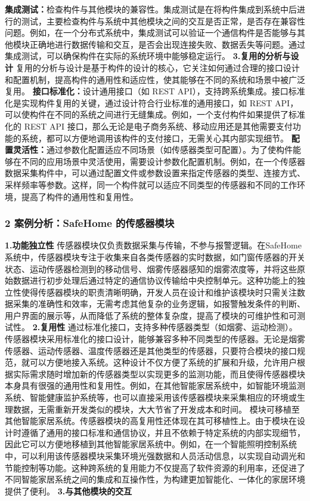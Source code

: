 \textbf{集成测试：}检查构件与其他模块的兼容性。集成测试是在将构件集成到系统中后进行的测试，主要检查构件与系统中其他模块之间的交互是否正常，是否存在兼容性问题。例如，在一个分布式系统中，集成测试可以验证一个通信构件是否能够与其他模块正确地进行数据传输和交互，是否会出现连接失败、数据丢失等问题。通过集成测试，可以确保构件在实际的系统环境中能够稳定运行。 \textbf{3.复用的分析与设计} 复用的分析与设计是基于构件的设计的核心，它关注如何通过合理的接口设计和配置机制，提高构件的通用性和适应性，使其能够在不同的系统和场景中被广泛复用。 \textbf{接口标准化：}设计通用接口（如 REST API），支持跨系统集成。接口标准化是实现构件复用的关键，通过设计符合行业标准的通用接口，如 REST API，可以使构件在不同的系统之间进行无缝集成。例如，一个支付构件如果提供了标准化的 REST API 接口，那么无论是电子商务系统、移动应用还是其他需要支付功能的系统，都可以方便地调用该构件的支付接口，无需关心其内部实现细节。 \textbf{配置灵活性：}通过参数化配置适应不同场景（如传感器类型可配置）。为了使构件能够在不同的应用场景中灵活使用，需要设计参数化配置机制。例如，在一个传感器数据采集构件中，可以通过配置文件或参数设置来指定传感器的类型、连接方式、采样频率等参数。这样，同一个构件就可以适应不同类型的传感器和不同的工作环境，提高了构件的通用性和复用性。 \subsubsection{2 案例分析：SafeHome 的传感器模块}\label{ux6848ux4f8bux5206ux6790safehome-ux7684ux4f20ux611fux5668ux6a21ux5757} \textbf{1.功能独立性} 传感器模块仅负责数据采集与传输，不参与报警逻辑。在SafeHome系统中，传感器模块专注于收集来自各类传感器的实时数据，如门窗传感器的开关状态、运动传感器检测到的移动信号、烟雾传感器感知的烟雾浓度等，并将这些原始数据进行初步处理后通过特定的通信协议传输给中央控制单元。这种功能上的独立性使得传感器模块的职责清晰明确，开发人员在设计和维护该模块时只需关注数据采集的准确性和效率，无需考虑其他复杂的业务逻辑，如报警触发条件的判断、用户界面的展示等，从而降低了系统的整体复杂度，提高了模块的可维护性和可测试性。 \textbf{2.复用性} 通过标准化接口，支持多种传感器类型（如烟雾、运动检测）。传感器模块采用标准化的接口设计，能够兼容多种不同类型的传感器。无论是烟雾传感器、运动传感器、温度传感器还是其他类型的传感器，只要符合模块的接口规范，就可以方便地接入系统。这种设计不仅方便了系统的扩展和升级，允许用户根据实际需求随时增加新的传感器类型以实现更多的监测功能，而且使得传感器模块本身具有很强的通用性和复用性。例如，在其他智能家居系统中，如智能环境监测系统、智能健康监护系统等，也可以直接采用该传感器模块来采集相应的环境或生理数据，无需重新开发类似的模块，大大节省了开发成本和时间。 模块可移植至其他智能家居系统。传感器模块的高复用性还体现在其可移植性上。由于模块在设计时遵循了通用的接口标准和通信协议，并且不依赖于特定系统的内部实现细节，因此它可以方便地移植到其他智能家居系统中。例如，在一个智能照明控制系统中，可以利用该传感器模块采集环境光强数据和人员活动信息，以实现自动调光和节能控制等功能。这种跨系统的复用能力不仅提高了软件资源的利用率，还促进了不同智能家居系统之间的集成和互操作性，为构建更加智能化、一体化的家居环境提供了便利。 \textbf{3.与其他模块的交互} 